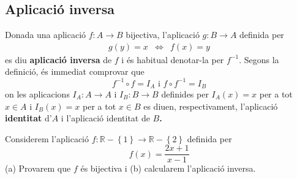 \subsection{Aplicació inversa}

Donada una aplicació $f:A\longrightarrow B$ bijectiva, l'aplicació $%
g:B\longrightarrow A$ definida per
\begin{equation*}
\begin{array}{ccc}
g(y)=x & \Longleftrightarrow & f(x)=y%
\end{array}
\end{equation*}
es diu \textbf{aplicació inversa} de $f$ i és habitual denotar-la
per $f^{-1}$. Segons la definició, és immediat comprovar que%
\begin{equation*}
f^{-1}\circ f=I_{A}\text{ \ \ i \ \ }f\circ f^{-1}=I_{B}
\end{equation*}
on les aplicacions $I_{A}:A\longrightarrow A$ i $I_{B}:B\longrightarrow B$
definides per $I_{A}(x)=x$ per a tot $x\in A$ i $I_{B}(x)=x$ per a tot $x\in
B$ es diuen, respectivament, l'aplicació \textbf{identitat} d'$A$ i
l'aplicació identitat de $B$\textbf{. }

\begin{exemple}
Considerem l'aplicació $f:\mathbb{R}-\left\{ 1\right\} \longrightarrow
\mathbb{R}-\left\{ 2\right\} $ definida per%
\begin{equation*}
f(x)=\frac{2x+1}{x-1}
\end{equation*}
(a) Provarem que $f$ és bijectiva i (b) calcularem l'aplicació
inversa.
\end{exemple}

